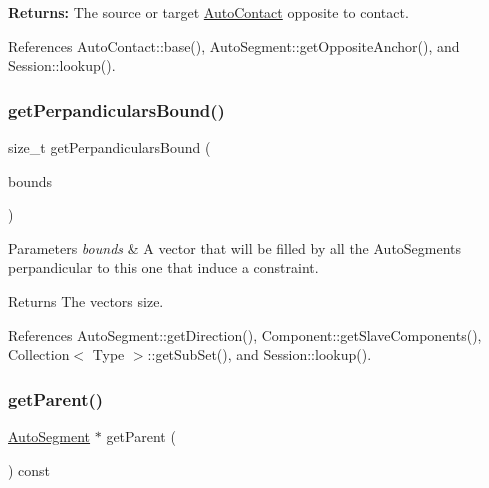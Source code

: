 {\bfseries Returns\+:} The source or target \mbox{\hyperlink{classKatabatic_1_1AutoContact}{Auto\+Contact}} opposite to {\ttfamily contact}. 

References Auto\+Contact\+::base(), Auto\+Segment\+::get\+Opposite\+Anchor(), and Session\+::lookup().

\mbox{\label{classKatabatic_1_1AutoSegment_a206b53c34f57945b6c7bdb711101e38f}} 
\subsubsection{\texorpdfstring{get\+Perpandiculars\+Bound()}{getPerpandicularsBound()}}
{\footnotesize\ttfamily size\+\_\+t get\+Perpandiculars\+Bound (\begin{DoxyParamCaption}\item[{set$<$ \mbox{\hyperlink{classKatabatic_1_1AutoSegment}{Auto\+Segment}} $\ast$$>$ \&}]{bounds }\end{DoxyParamCaption})}


\begin{DoxyParams}{Parameters}
{\em bounds} & A vector that will be filled by all the Auto\+Segments perpandicular to this one that induce a constraint. \\
\hline
\end{DoxyParams}
\begin{DoxyReturn}{Returns}
The vector\textquotesingle{}s size. 
\end{DoxyReturn}


References Auto\+Segment\+::get\+Direction(), Component\+::get\+Slave\+Components(), Collection$<$ Type $>$\+::get\+Sub\+Set(), and Session\+::lookup().

\mbox{\label{classKatabatic_1_1AutoSegment_a58c1170381b915930188608dab311442}} 
\subsubsection{\texorpdfstring{get\+Parent()}{getParent()}}
{\footnotesize\ttfamily \mbox{\hyperlink{classKatabatic_1_1AutoSegment}{Auto\+Segment}} $\ast$ get\+Parent (\begin{DoxyParamCaption}{ }\end{DoxyParamCaption}) const\hspace{0.3cm}{\ttfamily [inline]}}

